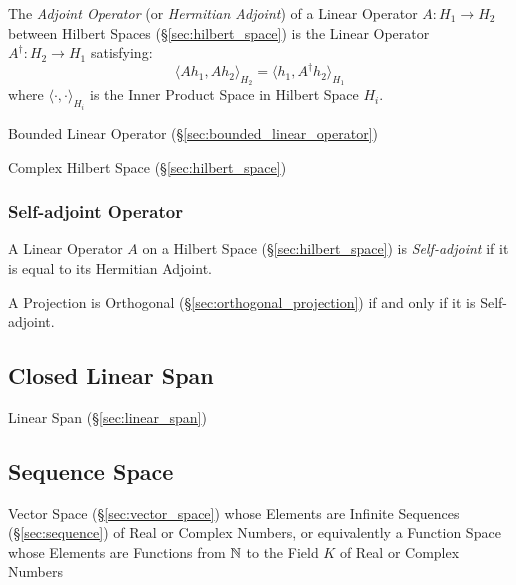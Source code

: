 The \emph{Adjoint Operator} (or \emph{Hermitian Adjoint}) of a
Linear Operator $A : H_1 \rightarrow H_2$ between Hilbert Spaces
(\S\ref{sec:hilbert_space}) is the Linear Operator $A^\dag : H_2 \rightarrow
H_1$ satisfying:
\[
  \langle{Ah_1,Ah_2}\rangle_{H_2} = \langle{h_1,A^{\dag}h_2}\rangle_{H_1}
\]
where $\langle\cdot,\cdot\rangle_{H_i}$ is the Inner Product Space in Hilbert
Space $H_i$.


Bounded Linear Operator (\S\ref{sec:bounded_linear_operator})

Complex Hilbert Space (\S\ref{sec:hilbert_space})



\subsubsection{Self-adjoint Operator}\label{sec:self_adjoint_operator}

A Linear Operator $A$ on a Hilbert Space (\S\ref{sec:hilbert_space}) is
\emph{Self-adjoint} if it is equal to its Hermitian Adjoint.

A Projection is Orthogonal (\S\ref{sec:orthogonal_projection}) if and only if
it is Self-adjoint.



\subsection{Closed Linear Span}\label{sec:closed_linear_span}

Linear Span (\S\ref{sec:linear_span})



\subsection{Sequence Space}\label{sec:sequence_space}

Vector Space (\S\ref{sec:vector_space}) whose Elements are Infinite Sequences
(\S\ref{sec:sequence}) of Real or Complex Numbers, or equivalently a Function
Space whose Elements are Functions from $\mathbb{N}$ to the Field $K$ of Real or
Complex Numbers



